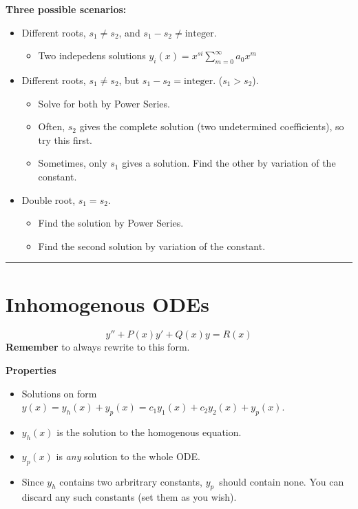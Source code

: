 \documentclass[10pt,a4paper]{article}
\newcommand{\Holine}[1][\medskipamount]{\par\vspace*{\dimexpr-\parskip-\baselineskip+#1}\noindent\rule{\linewidth}{3pt}\par\vspace*{\dimexpr-\parskip-.5\baselineskip+#1}}
\begin{document}
\begin{multicols}{2}
\textbf{Three possible scenarios:}
\begin{itemize}
    \item Different roots, $s_1\neq s_2$, and $s_1-s_2\neq \text{integer}$.
    \begin{itemize}
        \item Two indepedens solutions $y_i(x) = x^{si}\sum_{m=0}^\infty a_0 x^m$
    \end{itemize}
    \item Different roots, $s_1\neq s_2$, but $s_1-s_2=\text{integer}$. ($s_1>s_2$).
    \begin{itemize}
        \item Solve for both by Power Series.
        \item Often, $s_2$ gives the complete solution (two undetermined coefficients), so try this first.
        \item Sometimes, only $s_1$ gives a solution. Find the other by variation of the constant.
    \end{itemize}
    \item Double root, $s_1 = s_2$.
    \begin{itemize}
        \item Find the solution by Power Series.
        \item Find the second solution by variation of the constant.
    \end{itemize}
\end{itemize}



\Holine
\section*{Inhomogenous ODEs}
\[
    y'' + P(x)y' + Q(x)y = R(x)
\]
\textbf{Remember} to always rewrite to this form.

\textbf{Properties}
\begin{itemize}
    \item Solutions on form\\
    $y(x) = y_h(x) + y_p(x) = c_1y_1(x) + c_2y_2(x) + y_p(x)$.
    \item $y_h(x)$ is the solution to the homogenous equation.
    \item $y_p(x)$ is \textit{any} solution to the whole ODE.
    \item Since $y_h$ contains two arbritrary constants, $y_p$ should contain none. You can discard any such constants (set them as you wish).
\end{itemize}




\end{multicols}
\end{document}
